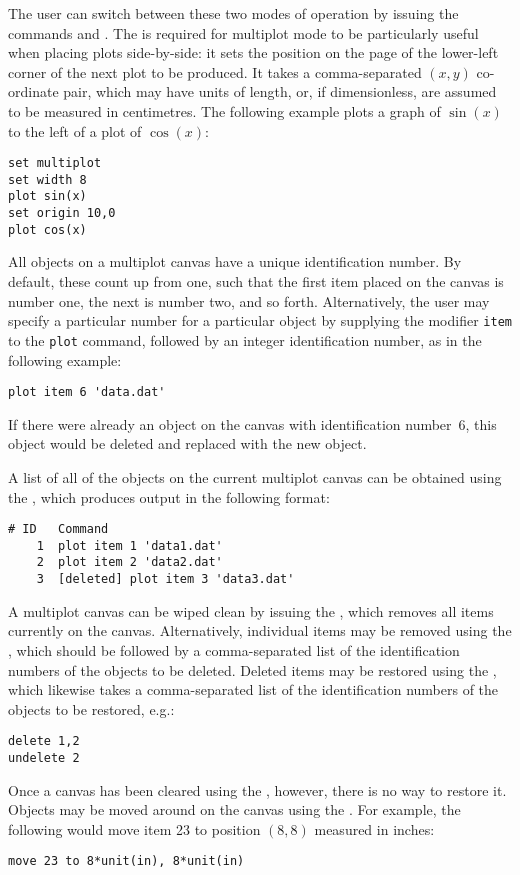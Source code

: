 The user can switch between these two modes of operation by issuing the
commands  and . The
 is required for multiplot mode to be particularly useful
when placing plots side-by-side: it sets the position on the page of the
lower-left corner of the next plot to be produced. It takes a comma-separated
$(x,y)$ co-ordinate pair, which may have units of length, or, if dimensionless,
are assumed to be measured in centimetres. The following example plots a graph
of $\sin(x)$ to the left of a plot of $\cos(x)$:
\begin{verbatim}
set multiplot
set width 8
plot sin(x)
set origin 10,0
plot cos(x)
\end{verbatim}

All objects on a multiplot canvas have a unique identification number.  By
default, these count up from one, such that the first item placed on the canvas
is number one, the next is number two, and so forth. Alternatively, the user
may specify a particular number for a particular object by supplying the
modifier {\tt item} to the {\tt plot} command, followed by an integer
identification number, as in the following example:
\begin{verbatim}
plot item 6 'data.dat'
\end{verbatim}
If there were already an object on the canvas with identification number~6,
this object would be deleted and replaced with the new object.

A list of all of the objects on the current multiplot canvas can be obtained
using the , which produces output in the following format:
\begin{verbatim}
# ID   Command
    1  plot item 1 'data1.dat'
    2  plot item 2 'data2.dat'
    3  [deleted] plot item 3 'data3.dat'
\end{verbatim}

A multiplot canvas can be wiped clean by issuing the , which
removes all items currently on the canvas. Alternatively, individual items may
be removed using the , which should be followed by a
comma-separated list of the identification numbers of the objects to be
deleted.  Deleted items may be restored using the , which
likewise takes a comma-separated list of the identification numbers of the
objects to be restored, e.g.:
\begin{verbatim}
delete 1,2
undelete 2
\end{verbatim}
Once a canvas has been cleared using the , however, there is no
way to restore it.  Objects may be moved around on the canvas using the
. For example, the following would move item 23 to position
$(8,8)$ measured in inches:
\begin{verbatim}
move 23 to 8*unit(in), 8*unit(in)
\end{verbatim}

